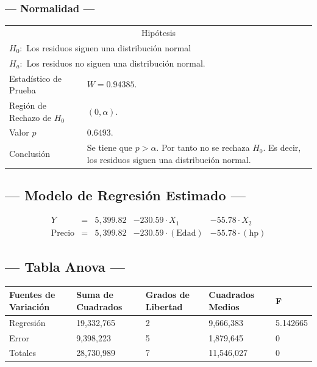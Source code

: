 \subsubsection{--- Normalidad ---} %
\begin{center}
  \begin{tabular}{|l|p{8cm}|}
    \cline{1-2}
    \multicolumn{2}{|c|}{Hipótesis}\\ \cline{1-2}
    \multicolumn{2}{|l|}{\(H_0:\) Los residuos siguen una distribución normal} \\ 
    \multicolumn{2}{|l|}{\(H_a:\) Los residuos no siguen una distribución normal.} \\ \cline{1-2}
    Estadístico de Prueba & \(W = 0.94385\).\\ \cline{1-2} 
		Región de Rechazo de \(H_0\) & \((0, \alpha )\).\\ \cline{1-2} 
    Valor \(p\) & \(0.6493\).\\ \cline{1-2} 
    Conclusión & Se tiene que \(p> \alpha\). \newline 
		Por tanto no se rechaza \(H_0\). \newline 
		Es decir, los residuos siguen una distribución normal.\\ \cline{1-2} 
  \end{tabular}
\end{center}


\subsection{\centering --- Modelo de Regresión Estimado ---} %
\begin{align}
	Y & = &              5,399.82 & - 230.59 \cdot X_1           & - 55.78  \cdot X_2   \\[2mm]
	\mbox{Precio} & = &  5,399.82 & - 230.59 \cdot (\mbox{Edad}) & - 55.78  \cdot (\mbox{hp})
	\label{eq:5}
\end{align}

\subsection{\centering --- Tabla Anova ---} %
\begin{center}
  \begin{tabular}{|l|l|l|l|l|}
    \hline 
    Fuentes de Variación  & Suma de Cuadrados & Grados de Libertad & Cuadrados Medios & F\\ \hline 
		Regresión & 19,332,765 & 2 &  9,666,383 & 5.142665 \\ \hline
		Error     &  9,398,223 & 5 &  1,879,645 & 0 \\ \hline
		Totales   & 28,730,989 & 7 & 11,546,027 & 0 \\ \hline
  \end{tabular}
\end{center} 

